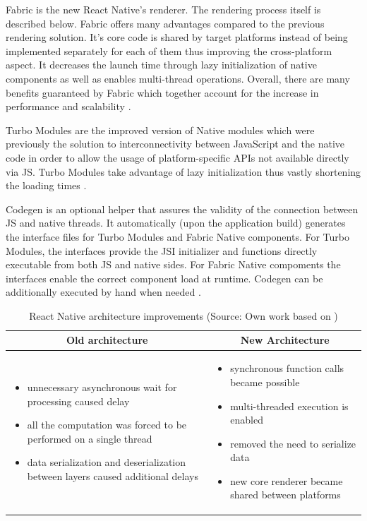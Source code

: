 Fabric is the new React Native's renderer. The rendering process itself is described below. Fabric offers many advantages compared to the previous rendering solution. It's core code is shared by target platforms instead of being implemented separately for each of them thus improving the cross-platform aspect. It decreases the launch time through lazy initialization of native components as well as enables multi-thread operations. Overall, there are many benefits guaranteed by Fabric which together account for the increase in performance and scalability \cite{react_native_docs_fabric}.

Turbo Modules are the improved version of Native modules which were previously the solution to interconnectivity between JavaScript and the native code in order to allow the usage of platform-specific APIs not available directly via JS. Turbo Modules take advantage of lazy initialization thus vastly shortening the loading times \cite{react_native_docs_turbo_modules}.

Codegen is an optional helper that assures the validity of the connection between JS and native threads. It automatically (upon the application build) generates the interface files for Turbo Modules and Fabric Native components. For Turbo Modules, the interfaces provide the JSI initializer and functions directly executable from both JS and native sides. For Fabric Native compoments the interfaces enable the correct component load at runtime. Codegen can be additionally executed by hand when needed \cite{react_native_docs_codegen}.

\begin{table}[h]
	\centering
	\caption{React Native architecture improvements (Source: Own work based on \cite{react_native_docs_why_new_architecture})}
	\label{tab:rn_architecture_improvements}
	\begin{tabular}{ |p{}|p{}| }
		\hline
		\multicolumn{1}{|c|}{\textbf{Old architecture}}&\multicolumn{1}{|c|}{\textbf{New Architecture}}\\
		\hline
		\begin{itemize}
			\item unnecessary asynchronous wait for processing caused delay 
			\item all the computation was forced to be performed on a single thread
			\item data serialization and deserialization between layers caused additional delays
		\end{itemize}&
		\begin{itemize}
			\item synchronous function calls became possible
			\item multi-threaded execution is enabled
			\item removed the need to serialize data
			\item new core renderer became shared between platforms
		\end{itemize}\\
		\hline
	\end{tabular}
\end{table}

